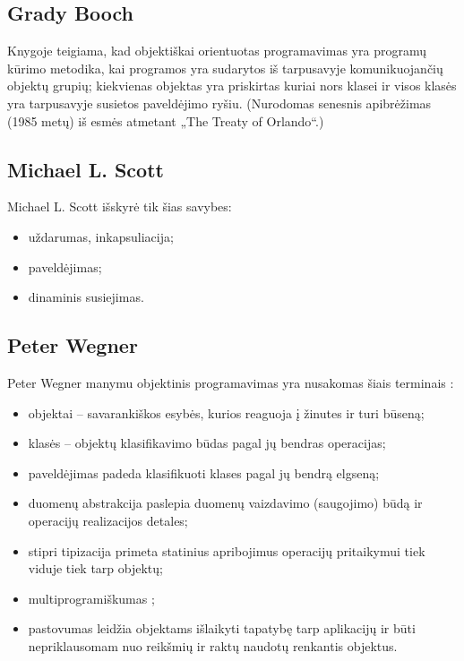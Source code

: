 \subsection{Grady Booch}

Knygoje \cite[41-42]{Booch:2007:OAD:1407387} teigiama, kad objektiškai
orientuotas programavimas yra programų kūrimo metodika, kai programos
yra sudarytos iš tarpusavyje komunikuojančių objektų grupių; kiekvienas
objektas yra priskirtas kuriai nors klasei ir visos klasės yra
tarpusavyje susietos paveldėjimo ryšiu. (Nurodomas senesnis
apibrėžimas (1985 metų) iš esmės atmetant „The Treaty of
Orlando“.)

\subsection{Michael L. Scott}

Michael L. Scott \cite[529-530]{programming-language-pragmatics}
išskyrė tik šias savybes:
\begin{itemize}
  \item uždarumas, inkapsuliacija;
  \item paveldėjimas;
  \item dinaminis susiejimas.
\end{itemize}

\subsection{Peter Wegner}

Peter Wegner manymu objektinis programavimas  yra nusakomas
šiais terminais \cite[168]{Wegner:1987:DOL:38807.38823}:
\begin{itemize}
  \item objektai  – savarankiškos esybės, kurios reaguoja į
    žinutes ir turi būseną;
  \item klasės  – objektų klasifikavimo būdas pagal jų bendras
    operacijas;
  \item paveldėjimas  padeda klasifikuoti klases pagal
    jų bendrą elgseną;
  \item duomenų abstrakcija  paslepia duomenų
    vaizdavimo (saugojimo) būdą ir operacijų realizacijos detales;
  \item stipri tipizacija  primeta statinius apribojimus
    operacijų pritaikymui tiek viduje tiek tarp objektų;
  \item multiprogramiškumas ;
  \item pastovumas  leidžia objektams išlaikyti tapatybę
    tarp aplikacijų ir būti nepriklausomam nuo reikšmių ir raktų naudotų
    renkantis objektus.
\end{itemize}

